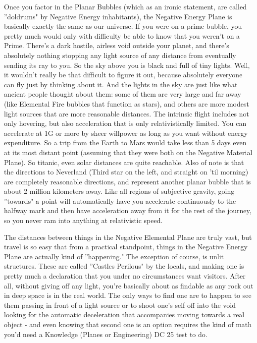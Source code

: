 Once you factor in the Planar Bubbles (which as an ironic statement, are called ''doldrums" by Negative Energy inhabitants), the Negative Energy Plane is basically exactly the same as our universe. If you were on a prime bubble, you pretty much would only with difficulty be able to know that you weren't on a Prime. There's a dark hostile, airless void outside your planet, and there's absolutely nothing stopping any light source of any distance from eventually sending its ray to you. So the sky above you is black and full of tiny lights. Well, it wouldn't really be that difficult to figure it out, because absolutely everyone can fly just by thinking about it. And the lights in the sky are just like what ancient people thought about them: some of them are very large and far away (like Elemental Fire bubbles that function as stars), and others are more modest light sources that are more reasonable distances. The intrinsic flight includes not only hovering, but also acceleration that is only relativistically limited. You can accelerate at 1G or more by sheer willpower as long as you want without energy expenditure. So a trip from the Earth to Mars would take less than 5 days even at its most distant point (assuming that they were both on the Negative Material Plane). So titanic, even solar distances are quite reachable. Also of note is that the directions to Neverland (Third star on the left, and straight on 'til morning) are completely reasonable directions, and represent another planar bubble that is about 2 million kilometers away. Like all regions of subjective gravity, going ''towards" a point will automatically have you accelerate continuously to the halfway mark and then have acceleration away from it for the rest of the journey, so you never ram into anything at relativistic speed.

The distances between things in the Negative Elemental Plane are truly vast, but travel is so easy that from a practical standpoint, things in the Negative Energy Plane are actually kind of ''happening." The exception of course, is unlit structures. These are called ''Castles Perilous" by the locals, and making one is pretty much a declaration that you under no circumstances want visitors. After all, without giving off any light, you're basically about as findable as any rock out in deep space is in the real world. The only ways to find one are to happen to see them passing in front of a light source or to shoot one's self off into the void looking for the automatic deceleration that accompanies moving towards a real object - and even knowing that second one is an option requires the kind of math you'd need a Knowledge (Planes or Engineering) DC 25 test to do.

